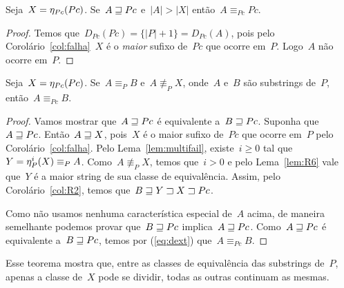 \begin{prop} \label{prop:newequiv}
Seja~$X = \eta_{Pc}(Pc)$. Se~$A \sqsupseteq Pc$ e~$|A| > |X|$ então~$A \equiv_{Pc} Pc$.
\end{prop}
\begin{proof}
Temos que~$D_{Pc}(Pc) = \{|P| + 1\} = D_{Pc}(A)$, pois pelo Corolário~\ref{col:falha}~$X$ é o \emph{maior} sufixo de~$Pc$ que ocorre em~$P$. Logo~$A$ não ocorre em~$P$.
\end{proof}

\begin{theorem}
\label{thm:refnotX}
Seja~$X = \eta_{Pc}(Pc)$. Se~$A \equiv_P B$ e~$A \not\equiv_P X$, onde~$A$ e~$B$ são substrings de~$P$, então~$A \equiv_{Pc} B$.
\end{theorem}

\begin{proof}
Vamos mostrar que~$A \sqsupseteq Pc$ é equivalente a~$B \sqsupseteq Pc$.
Suponha que~${A \sqsupseteq Pc}$. Então~${A \sqsupseteq X}$, pois~$X$ é o maior sufixo de~$Pc$ que ocorre em~$P$ pelo Corolário~\ref{col:falha}.
Pelo Lema~\ref{lem:multifail}, existe~${i \geq 0}$ tal que~${Y = \eta_P^i(X) \equiv_P A}$. Como~${A \not\equiv_P X}$, temos que~${i > 0}$ e pelo Lema~\ref{lem:R6} vale que~$Y$ é a maior string de sua classe de equivalência. Assim, pelo Corolário~\ref{col:R2}, temos que~${B \sqsupseteq Y \sqsupset X \sqsupset Pc}$.

Como não usamos nenhuma característica especial de~$A$ acima, de maneira semelhante podemos provar que~$B \sqsupseteq Pc$ implica~$A \sqsupseteq Pc$. Como~$A \sqsupseteq Pc$ é equivalente a~$B \sqsupseteq Pc$, temos por (\ref{eq:dext}) que~$A \equiv_{Pc} B$.
\end{proof}

Esse teorema mostra que, entre as classes de equivalência das substrings de~$P$, apenas a classe de~$X$ pode se dividir, todas as outras continuam as mesmas.


